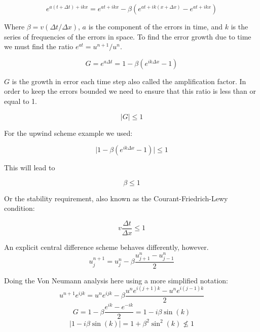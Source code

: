 \documentclass[12pt,upcase]{umlthesis}
\begin{document}
\begin{equation}
	e^{a(t+\Delta t)+ikx} = e^{at+ikx} - \beta (e^{at + ik(x+\Delta x)}-e^{at + ikx})
\end{equation}

Where $\beta = v(\Delta t / \Delta x)$, $a$ is the component of the errors in time, and $k$ is the series of frequencies of the errors in space. To find the error growth due to time we must find the ratio $e^{at} = u^{n+1}/u^n$.

\begin{equation}
	G = e^{a\Delta t} = 1 - \beta (e^{ik\Delta x}- 1)
\end{equation}

$G$ is the growth in error each time step also called the amplification factor. In order to keep the errors bounded we need to ensure that this ratio is less than or equal to 1.

\begin{equation}
	\lvert G \rvert \leq 1
\end{equation}

For the upwind scheme example we used:

\begin{equation}
	\lvert 1 - \beta (e^{ik\Delta x}- 1) \rvert \leq 1
\end{equation}

This will lead to

\begin{equation}
	\beta \leq 1
\end{equation}

Or the stability requirement, also known as the Courant-Friedrich-Lewy condition:

\begin{equation}
	v \frac{\Delta t}{\Delta x} \leq 1
\end{equation}

An explicit central difference scheme behaves differently, however.
\begin{equation}\label{eq:central}
	u^{n+1}_j = u^n_j - \beta \frac{u^n_{j+1}-u^n_{j-1}}{2}
\end{equation}

Doing the Von Neumann analysis here using a more simplified notation:
\begin{equation}
	u^{n+1} e^{ijk} = u^n e^{ijk} - \beta \frac{u^n e^{i(j+1)k} - u^n e^{i(j-1)k}}{2}
\end{equation}
\begin{equation}
	G = 1 - \beta \frac{e^{ik} - e^{-ik}}{2} = 1 - i\beta \sin{(k)}
\end{equation}
\begin{equation}
	\lvert 1 - i\beta \sin{(k)} \rvert = 1 + \beta^2 \sin^2(k) \nleq 1
\end{equation}
\end{document}
